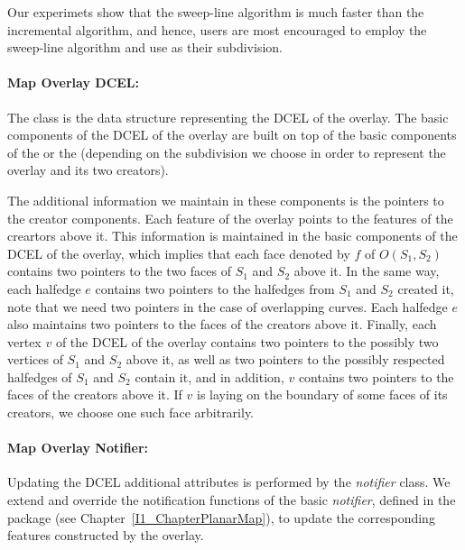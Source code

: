 Our experimets show that the sweep-line algorithm is much faster than the incremental algorithm,
and hence, users are most encouraged to employ the sweep-line algorithm 
and use  as their subdivision. 

\paragraph{Map Overlay DCEL:}
The 
class is the data structure representing the DCEL of the overlay. 
The basic components of the DCEL of the overlay are built 
on top of the basic components of the  or the  
(depending on the subdivision we choose in order to represent the overlay and its 
two creators).

The additional information we maintain in these components is the pointers 
to the creator components.
Each feature of the overlay points to the features of the creartors above it.
This information is maintained in the basic components of the DCEL of the overlay, 
which implies that each face denoted by $f$ of $O(S_1, S_2)$ contains two pointers 
to the two faces of $S_1$ and $S_2$  above it. 
In the same way, each halfedge $e$ contains two pointers to the halfedges 
from $S_1$ and $S_2$ created it, note that we need two pointers in the case of overlapping curves. 
Each halfedge $e$ also maintains two pointers to the faces of the creators above it. 
Finally, each vertex $v$ of the DCEL of the overlay contains two pointers to the 
possibly two vertices of $S_1$ and $S_2$ above it, 
as well as two pointers to the possibly respected halfedges of $S_1$ and $S_2$ 
contain it, and in addition, $v$ contains two pointers to the 
faces of the creators above it. If $v$ is laying on the boundary of some faces of its creators, 
we choose one such face arbitrarily.

\paragraph{Map Overlay Notifier:}
Updating the DCEL additional attributes is performed by the {\em notifier} class.
We extend and override the notification functions of the basic {\em notifier}, defined 
in the  package (see Chapter~\ref{I1_ChapterPlanarMap}), 
to update the corresponding features constructed by the overlay. 


